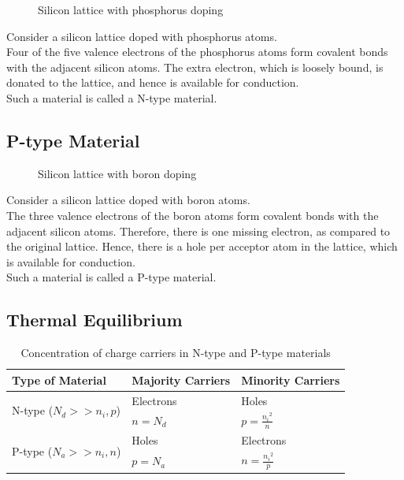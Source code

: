 \documentclass[titlepage, fleqn, a4paper, 12pt, twoside]{article}
\theoremstyle{definition}
\theoremstyle{theorem}
\begin{document}
\begin{figure}[h]
	\centering
	\caption{Silicon lattice with phosphorus doping}
\end{figure}

Consider a silicon lattice doped with phosphorus atoms.\\
Four of the five valence electrons of the phosphorus atoms form covalent bonds with the adjacent silicon atoms.
The extra electron, which is loosely bound, is donated to the lattice, and hence is available for conduction.\\
Such a material is called a N-type material.

\subsection{P-type Material}

\begin{figure}[h]
	\centering
	\caption{Silicon lattice with boron doping}
\end{figure}

Consider a silicon lattice doped with boron atoms.\\
The three valence electrons of the boron atoms form covalent bonds with the adjacent silicon atoms.
Therefore, there is one missing electron, as compared to the original lattice.
Hence, there is a hole per acceptor atom in the lattice, which is available for conduction.\\
Such a material is called a P-type material.

\subsection{Thermal Equilibrium}

\begin{table}[H]
	\centering
	\begin{tabular}{l l l}
		\toprule
		Type of Material & Majority Carriers & Minority Carriers\\
		\midrule
		\multirow{2}{*}{N-type ($N_d >> n_i,p$)} & Electrons & Holes\\
		& $n = N_d$ & $p = \frac{{n_i}^2}{n}$\\
		\midrule
		\multirow{2}{*}{P-type ($N_a >> n_i,n$)} & Holes & Electrons\\
		& $p = N_a$ & $n = \frac{{n_i}^2}{p}$\\
		\bottomrule
	\end{tabular}
	\caption{Concentration of charge carriers in N-type and P-type materials}
\end{table}
\end{document}
